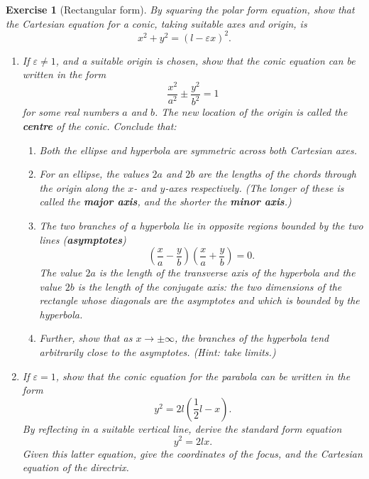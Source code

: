 \documentclass[a4paper,leqno,10pt]{article}
\theoremstyle{exercise}
\newtheorem{Exercise}{Exercise}
\newenvironment{exercise}
  {\begin{mdframed}\begin{Exercise}}
  {\end{Exercise}\end{mdframed}}
\theoremstyle{plain}
\theoremstyle{definition}
\theoremstyle{remark}
\newcommand{\df}{\textbf}
\begin{document}
\begin{exercise}[Rectangular form]\label{exercise:rectangular}
  By squaring the polar form equation, show that the Cartesian equation for a conic, taking suitable axes and origin, is
  \begin{displaymath}
    x^2 + y^2 = (l - \varepsilon x)^2.
  \end{displaymath}
  \begin{enumerate}
    \item If $ \varepsilon \neq 1 $, and a suitable origin is chosen, show that the conic equation can be written in the form
          \begin{displaymath}
            \frac{x^2}{a^2} \pm \frac{y^2}{b^2} = 1
          \end{displaymath}
          for some real numbers $ a $ and $ b $. The new location of the origin is called the \df{centre} of the conic. Conclude that:
          \begin{enumerate}
            \item Both the ellipse and hyperbola are symmetric across both Cartesian axes.
            \item For an ellipse, the values $ 2a $ and $ 2b $ are the lengths of the chords through the origin along the $ x$- and $ y$-axes respectively. (The
                  longer of these is called the \df{major axis}, and the shorter the \df{minor axis}.)
            \item The two branches of a hyperbola lie in opposite regions bounded by the two lines (\df{asymptotes})
                    \begin{displaymath}
                      \left(\frac{x}{a} - \frac{y}{b} \right)\left(\frac{x}{a} + \frac{y}{b} \right) = 0.
                    \end{displaymath}
                    The value $ 2a $ is the length of the transverse axis of the hyperbola and the value $ 2b $ is the length of the conjugate
                    axis: the two dimensions of the rectangle whose diagonals are the asymptotes and which is bounded by the hyperbola.
            \item Further, show that as $ x \to \pm\infty $, the branches of the hyperbola tend arbitrarily close to the asymptotes. (Hint: take limits.)
          \end{enumerate}
    \item If $ \varepsilon = 1 $, show that the conic equation for the parabola can be written in the form
          \begin{displaymath}
            y^2 = 2l(\frac{1}{2}l - x).
          \end{displaymath}
          By reflecting in a suitable vertical line, derive the standard form equation
          \begin{displaymath}
            y^2 = 2lx.
          \end{displaymath}
          Given this latter equation, give the coordinates of the focus, and the Cartesian equation of the directrix.
  \end{enumerate}
\end{exercise}
\end{document}
